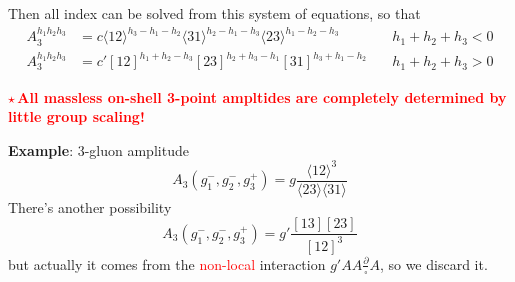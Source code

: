 \documentclass{beamer}
\newcommand{\avg}[1]{\langle #1 \rangle}
\begin{document}
\begin{frame}
    Then all index can be solved from this system of equations, so that
    \[
    \boxed{
    \begin{aligned}
        A_3^{h_1h_2h_3} &= c\avg{12}^{h_3-h_1-h_2}\avg{31}^{h_2-h_1-h_3}\avg{23}^{h_1-h_2-h_3}
        \quad & h_1+h_2+h_3 < 0 \\[0.5em]
        A_3^{h_1h_2h_3} &= c' [12]^{h_1+h_2-h_3}[23]^{h_2+h_3-h_1}[31]^{h_3+h_1-h_2}
        \quad & h_1+h_2+h_3 > 0
    \end{aligned}
        }
    \]

    \textbf{\textcolor{red}{$\star$\,All massless on-shell 3-point ampltides are completely determined by little group scaling!}}
    
    \textbf{Example}: 3-gluon amplitude\\
    \begin{equation*}
        A_3(g_1^-,g_2^-,g_3^+)=g\frac{\avg{12}^3}{\avg{23}\!\avg{31}}
    \end{equation*}
    There's another possibility 
    \begin{equation*}
        A_3(g_1^-,g_2^-,g_3^+)=g'\frac{[13][23]}{[12]^3}
    \end{equation*}
    but actually it comes from the \textcolor{red}{non-local} interaction $g'AA\frac{\partial}{\square}A$, so we discard it.
\end{frame}
\end{document}
